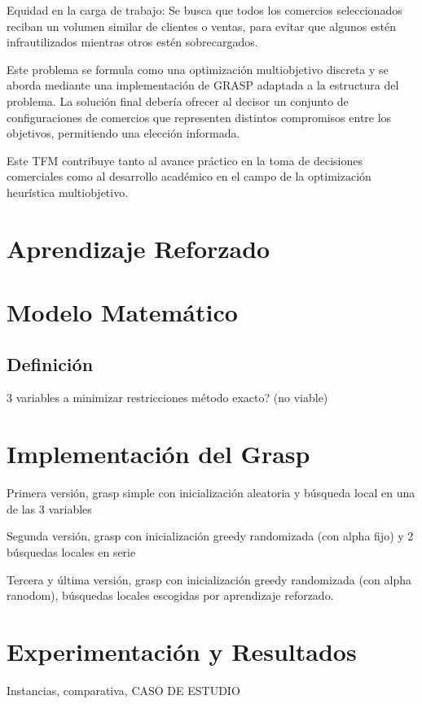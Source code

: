 \documentclass[12pt,a4paper]{book}
\begin{document}
Equidad en la carga de trabajo: Se busca que todos los comercios seleccionados reciban un volumen similar de clientes o ventas, para evitar que algunos estén infrautilizados mientras otros estén sobrecargados.

Este problema se formula como una optimización multiobjetivo discreta y se aborda mediante una implementación de GRASP adaptada a la estructura del problema. La solución final debería ofrecer al decisor un conjunto de configuraciones de comercios que representen distintos compromisos entre los objetivos, permitiendo una elección informada.

Este TFM contribuye tanto al avance práctico en la toma de decisiones comerciales como al desarrollo académico en el campo de la optimización heurística multiobjetivo.

\chapter{Aprendizaje Reforzado}

\chapter{Modelo Matemático}


\section{Definición}
3 variables a minimizar
restricciones
método exacto? (no viable)

\chapter{Implementación del Grasp}

Primera versión, grasp simple con inicialización aleatoria y búsqueda local en una de las 3 variables

Segunda versión, grasp con inicialización greedy randomizada (con alpha fijo) y 2 búsquedas locales en serie

Tercera y última versión, grasp con inicialización greedy randomizada (con alpha ranodom), búsquedas locales escogidas por aprendizaje reforzado.


\chapter{Experimentación y Resultados}

Instancias, comparativa, CASO DE ESTUDIO
\end{document}
